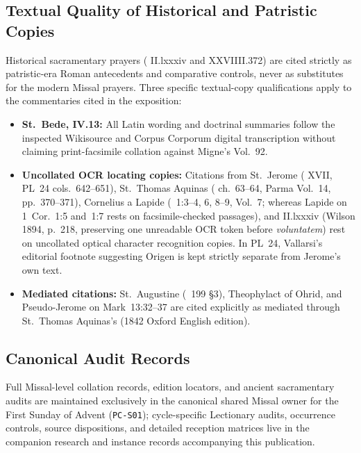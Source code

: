 \subsection{Textual Quality of Historical and Patristic Copies}
Historical sacramentary prayers ( II.lxxxiv and  XXVIIII.372) are cited strictly as patristic-era Roman antecedents and comparative controls, never as substitutes for the modern Missal prayers. Three specific textual-copy qualifications apply to the commentaries cited in the exposition:
\begin{itemize}
\item \textbf{St.~Bede,  IV.13:} All Latin wording and doctrinal summaries follow the inspected Wikisource and Corpus Corporum digital transcription without claiming print-facsimile collation against Migne's  Vol.~92.
\item \textbf{Uncollated OCR locating copies:} Citations from St.~Jerome ( XVII, PL~24 cols.~642--651), St.~Thomas Aquinas ( ch.~63--64, Parma Vol.~14, pp.~370--371), Cornelius a Lapide (~1:3--4, 6, 8--9, Vol.~7; whereas Lapide on 1~Cor.~1:5 and~1:7 rests on facsimile-checked passages), and  II.lxxxiv (Wilson 1894, p.~218, preserving one unreadable OCR token before \emph{voluntatem}) rest on uncollated optical character recognition copies. In PL~24, Vallarsi's editorial footnote suggesting Origen is kept strictly separate from Jerome's own text.
\item \textbf{Mediated  citations:} St.~Augustine (~199 §3), Theophylact of Ohrid, and Pseudo-Jerome on Mark~13:32--37 are cited explicitly as mediated through St.~Thomas Aquinas's  (1842 Oxford English edition).
\end{itemize}

\subsection{Canonical Audit Records}
Full Missal-level collation records, edition locators, and ancient sacramentary audits are maintained exclusively in the canonical shared Missal owner for the First Sunday of Advent (\texttt{PC-S01}); cycle-specific Lectionary audits, occurrence controls, source dispositions, and detailed reception matrices live in the companion research and instance records accompanying this publication.
